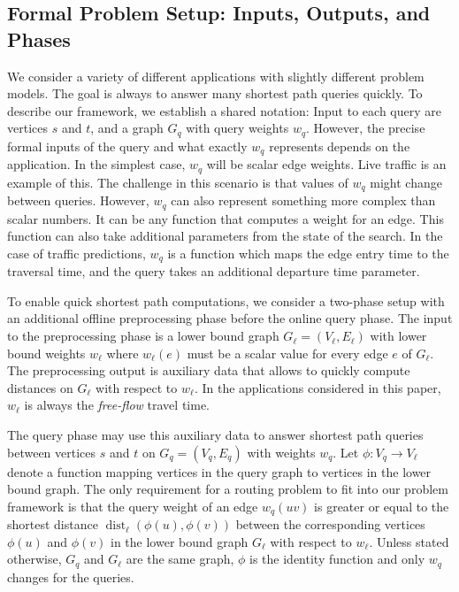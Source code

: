 \documentclass[manuscript,review]{acmart}
\newcommand*{\dist}{\operatorname{dist}}
\begin{document}
\subsection{Formal Problem Setup: Inputs, Outputs, and Phases}\label{sec:formal_framework}

We consider a variety of different applications with slightly different problem models.
The goal is always to answer many shortest path queries quickly.
To describe our framework, we establish a shared notation:
Input to each query are vertices $s$ and $t$, and a graph $G_q$ with query weights $w_q$.
However, the precise formal inputs of the query and what exactly $w_q$ represents depends on the application.
In the simplest case, $w_q$ will be scalar edge weights.
Live traffic is an example of this.
The challenge in this scenario is that values of $w_q$ might change between queries.
However, $w_q$ can also represent something more complex than scalar numbers.
It can be any function that computes a weight for an edge.
This function can also take additional parameters from the state of the search.
In the case of traffic predictions, $w_q$ is a function which maps the edge entry time to the traversal time, and the query takes an additional departure time parameter.

To enable quick shortest path computations, we consider a two-phase setup with an additional offline preprocessing phase before the online query phase.
The input to the preprocessing phase is a lower bound graph $G_\ell = (V_{\ell}, E_{\ell})$ with lower bound weights $w_\ell$ where $w_\ell(e)$ must be a scalar value for every edge $e$ of $G_\ell$.
The preprocessing output is auxiliary data that allows to quickly compute distances on $G_\ell$ with respect to $w_\ell$.
In the applications considered in this paper, $w_\ell$ is always the \emph{free-flow} travel time.

The query phase may use this auxiliary data to answer shortest path queries between vertices $s$ and $t$ on $G_q = (V_q, E_q)$ with weights $w_q$.
Let $\phi : V_q \to V_{\ell}$ denote a function mapping vertices in the query graph to vertices in the lower bound graph.
The only requirement for a routing problem to fit into our problem framework is that the query weight of an edge $w_q(u v)$ is greater or equal to the shortest distance $\dist_\ell(\phi(u), \phi(v))$ between the corresponding vertices $\phi(u)$ and $\phi(v)$ in the lower bound graph $G_\ell$ with respect to $w_\ell$.
Unless stated otherwise, $G_q$ and $G_\ell$ are the same graph, $\phi$ is the identity function and only $w_q$ changes for the queries.
\end{document}
